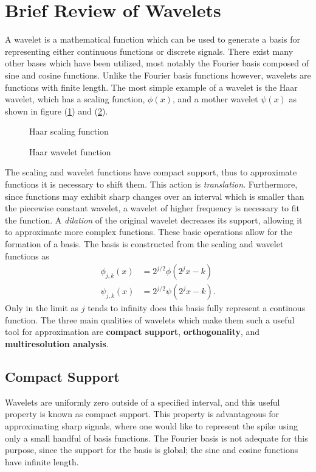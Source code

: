 \documentclass[10.5pt]{article}
\begin{document}
\section*{Brief Review of Wavelets}
A wavelet is a mathematical function which can be used to generate a basis for representing either continuous functions or 
discrete signals. There exist many other bases which have been utilized, most notably the Fourier
basis composed of sine and cosine functions.
Unlike the Fourier basis functions however, wavelets are functions with finite length. The most simple example of a wavelet
is the Haar wavelet, which has a scaling function, $\phi(x)$, and a mother wavelet $\psi(x)$ as shown in 
figure (\ref{fig:haar_scaling}) and (\ref{fig:haar_wavelet}).
\begin{figure}[H]
	\centering
	
	\caption{Haar scaling function}
	\label{fig:haar_scaling}
\end{figure}
\begin{figure}[H]
	\centering
	
	\caption{Haar wavelet function}
	\label{fig:haar_wavelet}
\end{figure}
The scaling and wavelet functions have compact support, thus to approximate functions it is necessary to shift them. 
This action is \textit{translation}. Furthermore, since functions may exhibit sharp changes over an
interval which is smaller than the piecewise constant wavelet, a wavelet of higher frequency is necessary
to fit the function. A \textit{dilation} of the original wavelet decreases its support, allowing it to 
approximate more complex functions. These basic operations allow for the formation of a basis.
The basis is constructed from the scaling and wavelet functions as
\begin{align}
\phi_{j,k}(x) & = 2^{j/2} \phi(2^j x - k) \\
\psi_{j,k}(x) & = 2^{j/2} \psi(2^j x - k).
\label{dilation equation}
\end{align}
Only in the limit as $j$ tends to infinity does this basis fully represent a continous function.
The three main qualities of wavelets which make them such a useful tool for 
approximation are \textbf{compact support}, \textbf{orthogonality}, and \textbf{multiresolution analysis}.

\subsection*{Compact Support}
Wavelets are uniformly zero outside of a specified interval, and this useful property is known as compact support.
This property is advantageous for approximating sharp signals, where one would like to represent the spike using only a small 
handful of basis functions. The Fourier basis is not adequate for this purpose, since the support for the basis is global; 
the sine and cosine functions have infinite length. 
\end{document}
